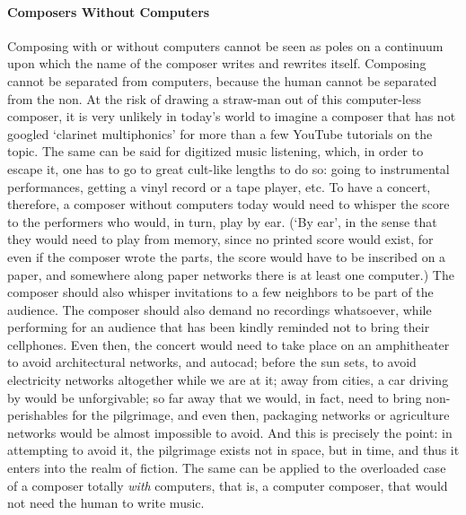 \paragraph{Composers Without Computers}
Composing with or without computers cannot be seen as poles on a continuum upon which the name of the composer writes and rewrites itself. Composing cannot be separated from computers, because the human cannot be separated from the non. At the risk of drawing a straw-man out of this computer-less composer, it is very unlikely in today's world to imagine a composer that has not googled `clarinet multiphonics' for more than a few YouTube tutorials on the topic. The same can be said for digitized music listening, which, in order to escape it, one has to go to great cult-like lengths to do so: going to instrumental performances, getting a vinyl record or a tape player, etc. To have a concert, therefore, a composer without computers today would need to whisper the score to the performers who would, in turn, play by ear. (`By ear', in the sense that they would need to play from memory, since no printed score would exist, for even if the composer wrote the parts, the score would have to be inscribed on a paper, and somewhere along paper networks there is at least one computer.) The composer should also whisper invitations to a few neighbors to be part of the audience. The composer should also demand no recordings whatsoever, while performing for an audience that has been kindly reminded not to bring their cellphones. Even then, the concert would need to take place on an amphitheater to avoid architectural networks, and \gls{autocad}; before the sun sets, to avoid electricity networks altogether while we are at it; away from cities, a car driving by would be unforgivable; so far away that we would, in fact, need to bring non-perishables for the pilgrimage, and even then, packaging networks or agriculture networks would be almost impossible to avoid. And this is precisely the point: in attempting to avoid it, the pilgrimage exists not in space, but in time, and thus it enters into the realm of fiction. The same can be applied to the overloaded case of a composer totally \textit{with} computers, that is, a computer composer, that would not need the human to write music. 

